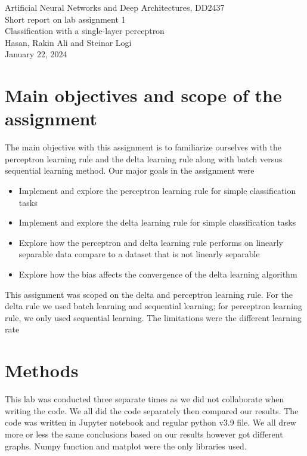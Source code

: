 \documentclass[a4paper]{article}
\begin{document}
\begin{center}
  {\large Artificial Neural Networks and Deep Architectures, DD2437}\\
  \vspace{7mm}
  {\huge Short report on lab assignment 1\\[1ex]}
  {\Large Classification with a single-layer perceptron}\\
  \vspace{8mm}  
  {\Large Hasan, Rakin Ali and Steinar Logi \\}
  \vspace{4mm}
  {\large January 22, 2024 \\}
\end{center}

\section{Main objectives and scope of the assignment \normalsize}
The main objective with this assignment is to familiarize ourselves with the perceptron learning rule and the delta learning rule along with batch versus sequential learning method. 
Our major goals in the assignment were  
\begin{itemize}
\item Implement and explore the perceptron learning rule for simple classification tasks
\item Implement and explore the delta learning rule for simple classification tasks 
\item Explore how the perceptron and delta learning rule performs on linearly separable data compare to a dataset that is not linearly separable
\item Explore how the bias affects the convergence of the delta learning algorithm
\end{itemize}

This assignment was scoped on the delta and perceptron learning rule. For the delta rule we used batch learning and sequential learning; for perceptron learning rule, we only used sequential learning. The limitations were the different learning rate

\section{Methods} This lab was conducted three separate times as we did not collaborate when writing the code. We all did the code separately then compared our results. The code was written in Jupyter notebook and regular python v3.9 file. We all drew more or less the same conclusions based on our results however got different graphs. Numpy function and matplot were the only libraries used.  \\
\end{document}
